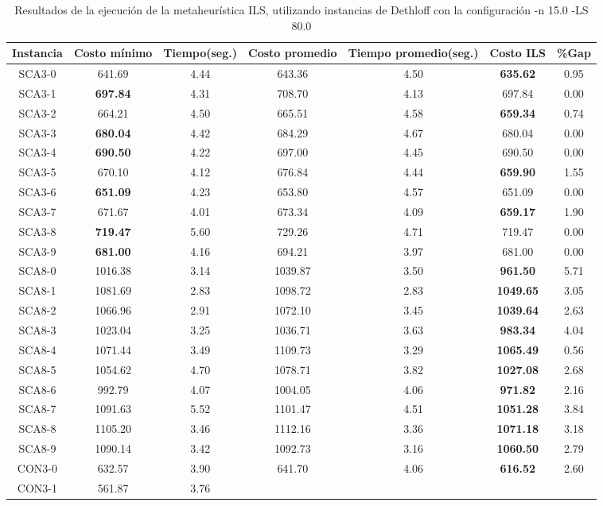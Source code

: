 \begin{table}[ht]
\caption{Resultados de la ejecución de la metaheurística ILS, utilizando instancias de Dethloff con la configuración -n 15.0 -LS 80.0}
\centering
\small
\begin{tabular}{c c c c c c c}
\hline\hline
Instancia & Costo mínimo & Tiempo(seg.) & Costo promedio & Tiempo promedio(seg.) & Costo ILS & \%Gap \\ [0.5ex]
\hline
SCA3-0 & 641.69 & 4.44 & 
643.36 & 4.50 & \bf{635.62} & 
0.95\\SCA3-1 & \bf{697.84} & 4.31 & 
708.70 & 4.13 & 697.84 & 0.00\\
SCA3-2 & 664.21 & 4.50 & 
665.51 & 4.58 & \bf{659.34} & 
0.74\\SCA3-3 & \bf{680.04} & 4.42 & 
684.29 & 4.67 & 680.04 & 0.00\\
SCA3-4 & \bf{690.50} & 4.22 & 
697.00 & 4.45 & 690.50 & 0.00\\
SCA3-5 & 670.10 & 4.12 & 
676.84 & 4.44 & \bf{659.90} & 
1.55\\SCA3-6 & \bf{651.09} & 4.23 & 
653.80 & 4.57 & 651.09 & 0.00\\
SCA3-7 & 671.67 & 4.01 & 
673.34 & 4.09 & \bf{659.17} & 
1.90\\SCA3-8 & \bf{719.47} & 5.60 & 
729.26 & 4.71 & 719.47 & 0.00\\
SCA3-9 & \bf{681.00} & 4.16 & 
694.21 & 3.97 & 681.00 & 0.00\\
SCA8-0 & 1016.38 & 3.14 & 
1039.87 & 3.50 & \bf{961.50} & 
5.71\\SCA8-1 & 1081.69 & 2.83 & 
1098.72 & 2.83 & \bf{1049.65} & 
3.05\\SCA8-2 & 1066.96 & 2.91 & 
1072.10 & 3.45 & \bf{1039.64} & 
2.63\\SCA8-3 & 1023.04 & 3.25 & 
1036.71 & 3.63 & \bf{983.34} & 
4.04\\SCA8-4 & 1071.44 & 3.49 & 
1109.73 & 3.29 & \bf{1065.49} & 
0.56\\SCA8-5 & 1054.62 & 4.70 & 
1078.71 & 3.82 & \bf{1027.08} & 
2.68\\SCA8-6 & 992.79 & 4.07 & 
1004.05 & 4.06 & \bf{971.82} & 
2.16\\SCA8-7 & 1091.63 & 5.52 & 
1101.47 & 4.51 & \bf{1051.28} & 
3.84\\SCA8-8 & 1105.20 & 3.46 & 
1112.16 & 3.36 & \bf{1071.18} & 
3.18\\SCA8-9 & 1090.14 & 3.42 & 
1092.73 & 3.16 & \bf{1060.50} & 
2.79\\CON3-0 & 632.57 & 3.90 & 
641.70 & 4.06 & \bf{616.52} & 
2.60\\CON3-1 & 561.87 & 3.76 & 

\end{tabular}
\end{table}
